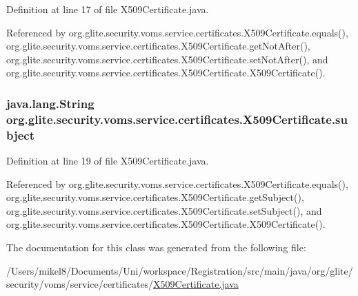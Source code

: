Definition at line 17 of file X509Certificate.java.



Referenced by org.glite.security.voms.service.certificates.X509Certificate.equals(), org.glite.security.voms.service.certificates.X509Certificate.getNotAfter(), org.glite.security.voms.service.certificates.X509Certificate.setNotAfter(), and org.glite.security.voms.service.certificates.X509Certificate.X509Certificate().

\hypertarget{classorg_1_1glite_1_1security_1_1voms_1_1service_1_1certificates_1_1X509Certificate_a36270b55a287194a45068375ad65723e}{
\subsubsection[{subject}]{\setlength{\rightskip}{0pt plus 5cm}java.lang.String {\bf org.glite.security.voms.service.certificates.X509Certificate.subject}}}
\label{classorg_1_1glite_1_1security_1_1voms_1_1service_1_1certificates_1_1X509Certificate_a36270b55a287194a45068375ad65723e}


Definition at line 19 of file X509Certificate.java.



Referenced by org.glite.security.voms.service.certificates.X509Certificate.equals(), org.glite.security.voms.service.certificates.X509Certificate.getSubject(), org.glite.security.voms.service.certificates.X509Certificate.setSubject(), and org.glite.security.voms.service.certificates.X509Certificate.X509Certificate().



The documentation for this class was generated from the following file:\begin{DoxyCompactItemize}
\item 
/Users/mikel8/Documents/Uni/workspace/Registration/src/main/java/org/glite/security/voms/service/certificates/\hyperlink{X509Certificate_8java}{X509Certificate.java}\end{DoxyCompactItemize}
